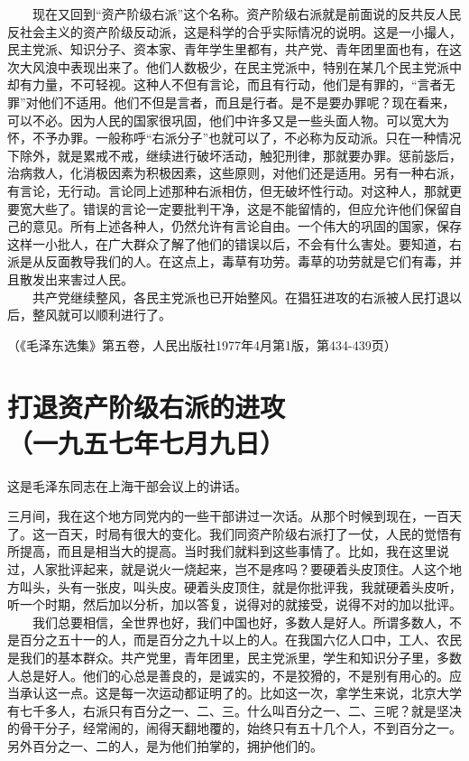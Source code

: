 \documentclass[cn,11pt,chinese]{elegantbook}
\def\myformat#1{\hfil\hfil #1}
\begin{document}
　　现在又回到“资产阶级右派”这个名称。资产阶级右派就是前面说的反共反人民反社会主义的资产阶级反动派，这是科学的合乎实际情况的说明。这是一小撮人，民主党派、知识分子、资本家、青年学生里都有，共产党、青年团里面也有，在这次大风浪中表现出来了。他们人数极少，在民主党派中，特别在某几个民主党派中却有力量，不可轻视。这种人不但有言论，而且有行动，他们是有罪的，“言者无罪”对他们不适用。他们不但是言者，而且是行者。是不是要办罪呢？现在看来，可以不必。因为人民的国家很巩固，他们中许多又是一些头面人物。可以宽大为怀，不予办罪。一般称呼“右派分子”也就可以了，不必称为反动派。只在一种情况下除外，就是累戒不戒，继续进行破坏活动，触犯刑律，那就要办罪。惩前毖后，治病救人，化消极因素为积极因素，这些原则，对他们还是适用。另有一种右派，有言论，无行动。言论同上述那种右派相仿，但无破坏性行动。对这种人，那就更要宽大些了。错误的言论一定要批判干净，这是不能留情的，但应允许他们保留自己的意见。所有上述各种人，仍然允许有言论自由。一个伟大的巩固的国家，保存这样一小批人，在广大群众了解了他们的错误以后，不会有什么害处。要知道，右派是从反面教导我们的人。在这点上，毒草有功劳。毒草的功劳就是它们有毒，并且散发出来害过人民。\\
　　共产党继续整风，各民主党派也已开始整风。在猖狂进攻的右派被人民打退以后，整风就可以顺利进行了。\\
\begin{flushright}（《毛泽东选集》第五卷，人民出版社1977年4月第1版，第434-439页）\end{flushright}
\newpage\section*{\myformat{打退资产阶级右派的进攻}\\\myformat{（一九五七年七月九日）}}
\begin{introduction}\item  这是毛泽东同志在上海干部会议上的讲话。\end{introduction}
三月间，我在这个地方同党内的一些干部讲过一次话。从那个时候到现在，一百天了。这一百天，时局有很大的变化。我们同资产阶级右派打了一仗，人民的觉悟有所提高，而且是相当大的提高。当时我们就料到这些事情了。比如，我在这里说过，人家批评起来，就是说火一烧起来，岂不是疼吗？要硬着头皮顶住。人这个地方叫头，头有一张皮，叫头皮。硬着头皮顶住，就是你批评我，我就硬着头皮听，听一个时期，然后加以分析，加以答复，说得对的就接受，说得不对的加以批评。\\
　　我们总要相信，全世界也好，我们中国也好，多数人是好人。所谓多数人，不是百分之五十一的人，而是百分之九十以上的人。在我国六亿人口中，工人、农民是我们的基本群众。共产党里，青年团里，民主党派里，学生和知识分子里，多数人总是好人。他们的心总是善良的，是诚实的，不是狡猾的，不是别有用心的。应当承认这一点。这是每一次运动都证明了的。比如这一次，拿学生来说，北京大学有七千多人，右派只有百分之一、二、三。什么叫百分之一、二、三呢？就是坚决的骨干分子，经常闹的，闹得天翻地覆的，始终只有五十几个人，不到百分之一。另外百分之一、二的人，是为他们拍掌的，拥护他们的。\\
\end{document}

